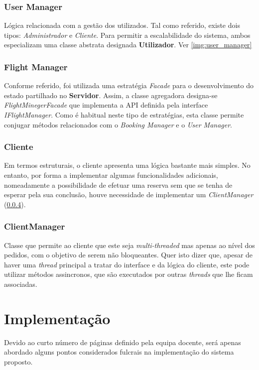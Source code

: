 \documentclass[a4paper,11pt]{article}
\begin{document}
\subsubsection{User Manager}
Lógica relacionada com a gestão dos utilizados. Tal como referido, existe dois tipos:
\textit{Administrador} e \textit{Cliente}.
Para permitir a escalabilidade do sistema, ambos especializam uma classe abstrata designada
\textbf{Utilizador}. Ver \ref{img:user_manager}

\subsubsection{Flight Manager}
Conforme referido, foi utilizada uma estratégia \textit{Facade} para o desenvolvimento
do estado partilhado no \textbf{Servidor}.
Assim, a classe agregadora designa-se \textit{FlightMinegerFacade} que implementa a API definida
pela interface \textit{IFlightManager}.
Como é habitual neste tipo de estratégias, esta classe permite conjugar métodos relacionados com 
o \textit{Booking Manager} e o \textit{User Manager}.

\subsubsection{Cliente}
Em termos estruturais, o cliente apresenta uma lógica bastante mais simples.
No entanto, por forma a implementar algumas funcionalidades adicionais, nomeadamente
a possibilidade de efetuar uma reserva sem que se tenha de esperar pela sua conclusão,
houve necessidade de implementar um \textit{ClientManager} (\ref{sec:client_manager}).

\subsubsection{ClientManager} \label{sec:client_manager}
Classe que permite ao cliente que este seja \textit{multi-threaded} mas apenas ao nível dos pedidos,
com o objetivo de serem não bloqueantes.
Quer isto dizer que, apesar de haver uma \textit{thread} principal a tratar do interface
e da lógica do cliente, este pode utilizar métodos assincronos, que são executados por 
outras \textit{threads} que lhe ficam associadas.

\section{Implementação}
Devido ao curto número de páginas definido pela equipa docente, será apenas abordado alguns pontos
considerados fulcrais na implementação do sistema proposto.
\end{document}
